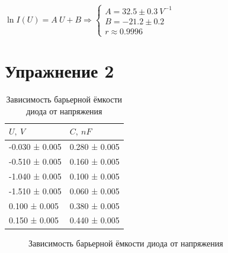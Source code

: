\documentclass[12pt]{article}
\begin{document}
$\ln I(U) = A \: U + B \Longrightarrow \left\lbrace \begin{array}{c}
A = 32.5 \pm 0.3 \: V^{-1}\\ 
B = -21.2 \pm 0.2\\ 
r \approx 0.9996
\end{array}\right. $

\section*{Упражнение 2}
\indent
  
  \begin{table}[H]
  \begin{tabular}{ll}
  	\toprule
  	$U,\: V$ &          $C,\: nF$ \\
  	\midrule
  	-0.030 ± 0.005 &  0.280 ± 0.005 \\
  	-0.510 ± 0.005 &  0.160 ± 0.005 \\
  	-1.040 ± 0.005 &  0.100 ± 0.005 \\
  	-1.510 ± 0.005 &  0.060 ± 0.005 \\
  	0.100 ± 0.005 &  0.380 ± 0.005 \\
  	0.150 ± 0.005 &  0.440 ± 0.005 \\
  	\bottomrule
  \end{tabular}
\caption{Зависимость барьерной ёмкости диода от напряжения}
\end{table}

\begin{figure}[H]
	\caption{Зависимость барьерной ёмкости диода от напряжения}
	\label{fig:image4}
\end{figure}
\end{document}
